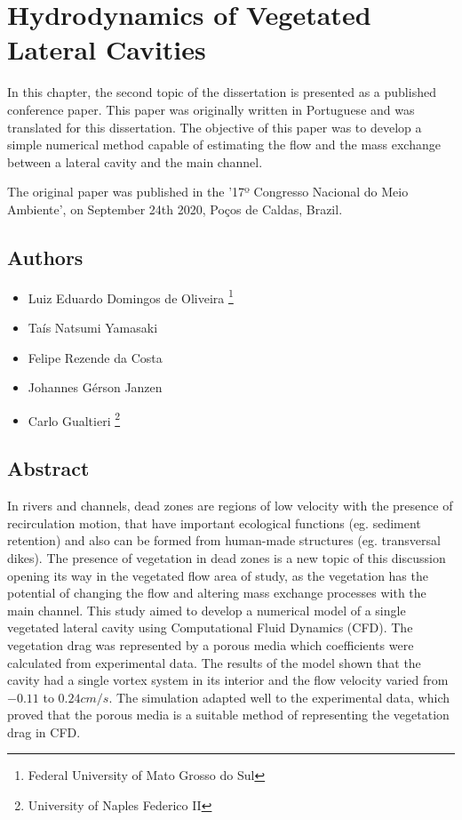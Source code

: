 \chapter{Hydrodynamics of Vegetated Lateral Cavities}
\label{chap:art2}
In this chapter, the second topic of the dissertation is presented as a published conference paper. This paper was originally written in Portuguese and was translated for this dissertation. The objective of this paper was to develop a simple numerical method capable of estimating the flow and the mass exchange between a lateral cavity and the main channel. 

The original paper was published in the '17º Congresso Nacional do Meio Ambiente', on September 24th 2020, Poços de Caldas, Brazil.
\section*{Authors}
\begin{itemize}
    \item Luiz Eduardo Domingos de Oliveira \footnote{Federal University of Mato Grosso do Sul}
    \item Taís Natsumi Yamasaki \footnotemark[1]
    \item Felipe Rezende da Costa \footnotemark[1]
    \item Johannes Gérson Janzen \footnotemark[1]
    \item Carlo Gualtieri \footnote{University of Naples Federico II}
\end{itemize}
\section*{Abstract}
In rivers and channels, dead zones are regions of low velocity with the presence of recirculation motion, that have important ecological functions (eg. sediment retention) and also can be formed from human-made structures (eg. transversal dikes). The presence of vegetation in dead zones is a new topic of this discussion opening its way in the vegetated flow area of study, as the vegetation has the potential of changing the flow and altering mass exchange processes with the main channel. This study aimed to develop a numerical model of a single vegetated lateral cavity using Computational Fluid Dynamics (CFD). The vegetation drag was represented by a porous media which coefficients were calculated from experimental data. The results of the model shown that the cavity had a single vortex system in its interior and the flow velocity varied from $-0.11$ to $ 0.24 cm/s$. The simulation adapted well to the experimental data, which proved that the porous media is a suitable method of representing the vegetation drag in CFD.

